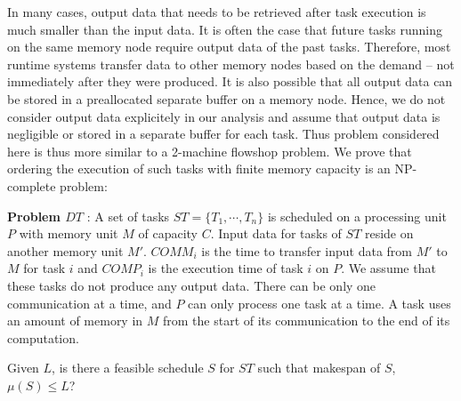 \documentclass[sigconf]{acmart}
\begin{document}
	
	In many cases, output data that needs to be retrieved after task execution is much smaller than the input data. It is often the case that future tasks running on the same memory node require output data of the past tasks. Therefore, most runtime systems transfer data to other memory nodes based on the demand -- not immediately after they were produced. It is also possible that all output data can be stored in a preallocated separate buffer on a memory node. Hence, we do not consider output data explicitely in our analysis and assume that output data is negligible or stored in a separate buffer for each task. Thus problem considered here is thus more similar to a 2-machine flowshop problem. We prove that ordering the execution of such tasks with finite memory capacity is an NP-complete problem: %
	
	
	\noindent\textbf{Problem $DT$} : A set of tasks $ST=\{T_1,
	\cdots, T_n\}$ is scheduled on a processing unit $P$ with
	memory unit $M$ of capacity $C$. Input data for tasks of $ST$
	reside on another memory unit $M'$. $COMM_i$ is the time to
	transfer input data from $M'$ to $M$ for task $i$ and $COMP_i$
	is the execution time of task $i$ on $P$. We assume that these
	tasks do not produce any output data. There can be only one
	communication at a time, and $P$ can only process one task at
	a time. A task uses an amount of memory in  $M$ from the
	start of its communication to the end of its computation.
	
	\noindent Given $L$, is there a feasible schedule $S$ for $ST$ such that
	makespan of $S$, $\mu(S) \le L$?
	
\end{document}
